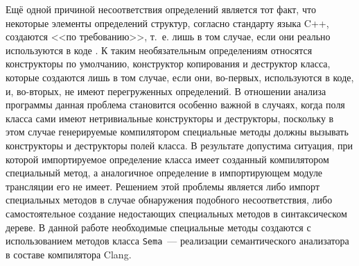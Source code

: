 Ещё одной причиной несоответствия определений является тот факт, что некоторые элементы определений структур, согласно стандарту языка C++, создаются <<по требованию>>, т.~е. лишь в том случае, если они реально используются в коде \cite{cpp-std}. К таким необязательным определениям относятся конструкторы по умолчанию, конструктор копирования и деструктор класса, которые создаются лишь в том случае, если они, во-первых, используются в коде, и, во-вторых, не имеют перегруженных определений. В отношении анализа программы данная проблема становится особенно важной в случаях, когда поля класса сами имеют нетривиальные конструкторы и деструкторы, поскольку в этом случае генерируемые компилятором специальные методы должны вызывать конструкторы и деструкторы полей класса. В результате допустима ситуация, при которой импортируемое определение класса имеет созданный компилятором специальный метод, а аналогичное определение в импортирующем модуле трансляции его не имеет. Решением этой проблемы является либо импорт специальных методов в случае обнаружения подобного несоответствия, либо самостоятельное создание недостающих специальных методов в синтаксическом дереве. В данной работе необходимые специальные методы создаются с использованием методов класса \texttt{Sema}~--- реализации семантического анализатора в составе компилятора Clang.
